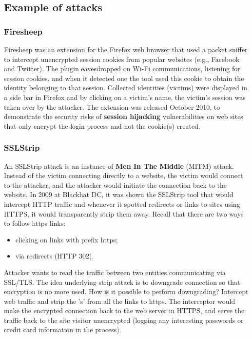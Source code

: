 \documentclass[a4paper, 10pt, titlepage]{article}
\begin{document}
\subsection{Example of attacks}
\subsubsection*{Firesheep}
Firesheep was an extension for the Firefox web browser that used a packet sniffer to intercept unencrypted session cookies from popular websites (e.g., Facebook and Twitter). The plugin eavesdropped on Wi-Fi communications, listening for session cookies, and when it detected one the tool used this cookie to obtain the identity belonging to that session. Collected identities (victims) were displayed in a side bar in Firefox and by clicking on a victim's name, the victim's session was taken over by the attacker. The extension was released October 2010, to demonstrate the security risks of \textbf{session hijacking} vulnerabilities on web sites that only encrypt the login process and not the cookie(s) created.

\subsubsection{SSLStrip}
An SSLStrip attack is an instance of \textbf{Men In The Middle} (MITM) attack. Instead of the victim connecting directly to a website, the victim would connect to the attacker, and the attacker would initiate the connection back to the website.
In 2009 at Blackhat DC, it was shown the SSLStrip tool that would intercept HTTP traffic and whenever it spotted redirects or links to sites using HTTPS, it would transparently strip them away. Recall that there are two ways to follow https links:
\begin{itemize}
\item clicking on links with prefix https;
\item via redirects (HTTP 302).
\end{itemize} 
Attacker wants to read the traffic between two entities communicating via SSL/TLS. The idea underlying strip attack is to downgrade connection so that encryption is no more used. How is it possible to perform downgrading? Intercept web traffic and strip the 's' from all the links to https. The interceptor would make the encrypted connection back to the web server in HTTPS, and serve the traffic back to the site visitor unencrypted (logging any interesting passwords or credit card information in the process).
\end{document}
